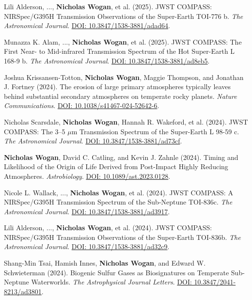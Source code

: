 \documentclass[12pt]{article}
\begin{document}
\begin{cvlist}
\item[2025]
  Lili Alderson, ..., \textbf{Nicholas Wogan}, et al. (2025). JWST COMPASS: NIRSpec/G395H Transmission Observations of the Super-Earth TOI-776 b. \emph{The Astronomical Journal}. \href{https://doi.org/10.3847/1538-3881/adad64}{DOI: 10.3847/1538-3881/adad64}.
\item[2025]
  Munazza K. Alam, ..., \textbf{Nicholas Wogan}, et al. (2025). JWST COMPASS: The First Near- to Mid-infrared Transmission Spectrum of the Hot Super-Earth L 168-9 b. \emph{The Astronomical Journal}. \href{https://doi.org/10.3847/1538-3881/ad8eb5}{DOI: 10.3847/1538-3881/ad8eb5}.
\item[2024]
  Joshua Krissansen-Totton, \textbf{Nicholas Wogan}, Maggie Thompson, and Jonathan J. Fortney (2024). The erosion of large primary atmospheres typically leaves behind substantial secondary atmospheres on temperate rocky planets. \emph{Nature Communications}. \href{https://doi.org/10.1038/s41467-024-52642-6}{DOI: 10.1038/s41467-024-52642-6}.
\item[2024]
  Nicholas Scarsdale, \textbf{Nicholas Wogan}, Hannah R. Wakeford, et al. (2024). JWST COMPASS: The 3--5 $\mu$m Transmission Spectrum of the Super-Earth L 98-59 c. \emph{The Astronomical Journal}. \href{https://doi.org/10.3847/1538-3881/ad73cf}{DOI: 10.3847/1538-3881/ad73cf}.
\item[2024]
  \textbf{Nicholas Wogan}, David C. Catling, and Kevin J. Zahnle (2024). Timing and Likelihood of the Origin of Life Derived from Post-Impact Highly Reducing Atmospheres. \emph{Astrobiology}. \href{https://doi.org/10.1089/ast.2023.0128}{DOI: 10.1089/ast.2023.0128}.
\item[2024]
  Nicole L. Wallack, ..., \textbf{Nicholas Wogan}, et al. (2024). JWST COMPASS: A NIRSpec/G395H Transmission Spectrum of the Sub-Neptune TOI-836c. \emph{The Astronomical Journal}. \href{https://doi.org/10.3847/1538-3881/ad3917}{DOI: 10.3847/1538-3881/ad3917}.
\item[2024]
  Lili Alderson, ..., \textbf{Nicholas Wogan}, et al. (2024). JWST COMPASS: NIRSpec/G395H Transmission Observations of the Super-Earth TOI-836b. \emph{The Astronomical Journal}. \href{https://doi.org/10.3847/1538-3881/ad32c9}{DOI: 10.3847/1538-3881/ad32c9}.
\item[2024]
  Shang-Min Tsai, Hamish Innes, \textbf{Nicholas Wogan}, and Edward W. Schwieterman (2024). Biogenic Sulfur Gases as Biosignatures on Temperate Sub-Neptune Waterworlds. \emph{The Astrophysical Journal Letters}. \href{https://doi.org/10.3847/2041-8213/ad3801}{DOI: 10.3847/2041-8213/ad3801}.

\end{cvlist}
\end{document}
